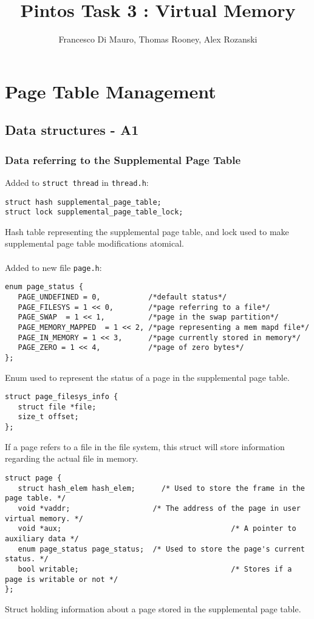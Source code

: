 \documentclass[a4wide, 11pt]{article}
\newcommand{\tx}{\texttt}
\begin{document}
\title{Pintos Task 3 : Virtual Memory}
\author{Francesco Di Mauro, Thomas Rooney, Alex Rozanski}

\maketitle

\section{Page Table Management}
\subsection{Data structures - A1}
\subsubsection{Data referring to the Supplemental Page Table}

Added to \tx{struct thread} in \tx{thread.h}:
\begin{verbatim}
struct hash supplemental_page_table;
struct lock supplemental_page_table_lock;
\end{verbatim}
Hash table representing the supplemental page table, and lock used to make supplemental page table modifications atomical. \\\\
Added to new file \tx{page.h}:
\begin{verbatim}
enum page_status {
   PAGE_UNDEFINED = 0,           /*default status*/
   PAGE_FILESYS = 1 << 0,        /*page referring to a file*/
   PAGE_SWAP  = 1 << 1,          /*page in the swap partition*/
   PAGE_MEMORY_MAPPED  = 1 << 2, /*page representing a mem mapd file*/
   PAGE_IN_MEMORY = 1 << 3,      /*page currently stored in memory*/
   PAGE_ZERO = 1 << 4,           /*page of zero bytes*/
};
\end{verbatim}
Enum used to represent the status of a page in the supplemental page table.

\begin{verbatim}
struct page_filesys_info {
   struct file *file;
   size_t offset;
};
\end{verbatim}
If a page refers to a file in the file system, this struct will store information regarding the actual file in memory.


\begin{verbatim}
struct page {
   struct hash_elem hash_elem;   	/* Used to store the frame in the page table. */
   void *vaddr;                   /* The address of the page in user virtual memory. */
   void *aux;	               					    /* A pointer to auxiliary data */
   enum page_status page_status;  /* Used to store the page's current status. */
   bool writable;					                /* Stores if a page is writable or not */
};
\end{verbatim}
Struct holding information about a page stored in the supplemental page table.
\end{document}
